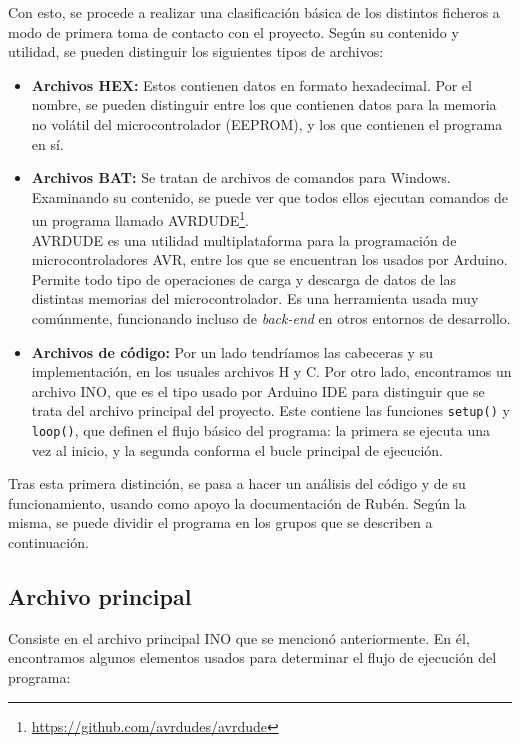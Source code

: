 Con esto, se procede a realizar una clasificación básica de los distintos ficheros a modo de primera toma de contacto con el proyecto. Según su contenido y utilidad, se pueden distinguir los siguientes tipos de archivos:

\begin{itemize}
    \item{\textbf{Archivos HEX:}} Estos contienen datos en formato hexadecimal. Por el nombre, se pueden distinguir entre los que contienen datos para la memoria no volátil del microcontrolador (EEPROM), y los que contienen el programa en sí.
    \item{\textbf{Archivos BAT:}} Se tratan de archivos de comandos para Windows. Examinando su contenido, se puede ver que todos ellos ejecutan comandos de un programa llamado AVRDUDE\footnote{\url{https://github.com/avrdudes/avrdude}}.\\
    AVRDUDE es una utilidad multiplataforma para la programación de microcontroladores AVR, entre los que se encuentran los usados por Arduino. Permite todo tipo de operaciones de carga y descarga de datos de las distintas memorias del microcontrolador. Es una herramienta usada muy comúnmente, funcionando incluso de \textit{back-end} en otros entornos de desarrollo.
    \item{\textbf{Archivos de código:}} Por un lado tendríamos las cabeceras y su implementación, en los usuales archivos H y C. Por otro lado, encontramos un archivo INO, que es el tipo usado por Arduino IDE para distinguir que se trata del archivo principal del proyecto. Este contiene las funciones \verb|setup()| y \verb|loop()|, que definen el flujo básico del programa: la primera se ejecuta una vez al inicio, y la segunda conforma el bucle principal de ejecución.
\end{itemize}

Tras esta primera distinción, se pasa a hacer un análisis del código y de su funcionamiento, usando como apoyo la documentación de Rubén. Según la misma, se puede dividir el programa en los grupos que se describen a continuación.

\subsection{Archivo principal}

Consiste en el archivo principal INO que se mencionó anteriormente. En él, encontramos algunos elementos usados para determinar el flujo de ejecución del programa:

